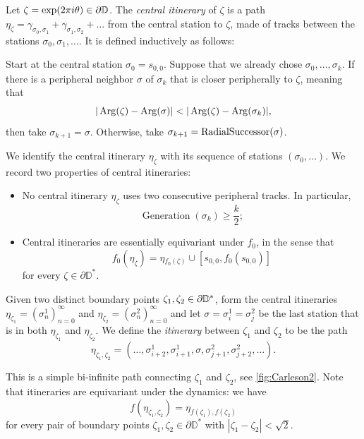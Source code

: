 \begin{definition}
Let $\zeta=\exp(2\pi i\theta)\in\partial\mathbb{D}$. 
The \emph{central itinerary} of $\zeta$ is a path 
$\eta_\zeta = \gamma _{\sigma_0,\sigma_1} + \gamma_{\sigma_1,\sigma_2}+\ldots$ 
from the central station to $\zeta$, made of tracks between the stations 
$\sigma_0,\sigma_1,\dots$. It is defined inductively as follows:

Start at the central station $\sigma_0=s_{0,0}$. Suppose that we already chose $\sigma_0,\ldots,\sigma_k$. If there is a peripheral neighbor $\sigma$ of $\sigma_k$ that is closer peripherally to $\zeta$, meaning that
$$
|\operatorname{Arg}(\zeta)-\operatorname{Arg}(\sigma)|
< |\operatorname{Arg}(\zeta)-\operatorname{Arg}(\sigma_{k})|,
$$
then take $\sigma_{k+1}=\sigma$. Otherwise, take $\sigma_{k+1}=\operatorname{RadialSuccessor}(\sigma)$.
\end{definition}



We identify the central itinerary $\eta_{\zeta}$ with its sequence of stations $(\sigma_0,\ldots)$. We record two properties of central itineraries:

\begin{itemize}
	\item No central itinerary $\eta_{\zeta}$ uses two consecutive peripheral tracks. In particular,
	\begin{equation}
	\label{generation-lower-bound}
		\operatorname{Generation}(\sigma_k)\geq \frac k2;
	\end{equation}
	
	\item Central itineraries are essentially equivariant under $f_{0}$, in the sense that
	\begin{equation*}
		f_{0}(\eta_{\zeta})=\eta{}_{f_{0}(\zeta)}\cup[s_{0,0},f_0(s_{0,0})]
	\end{equation*}
	for every $\zeta\in \partial \mathbb D^*$.
\end{itemize}

\begin{definition}
\label{def-disk-itinerary}
Given two distinct boundary points $\zeta_{1},\zeta_{2}\in\partial\mathbb{D}^*$, form the central itineraries $\eta_{\zeta_{1}}= (\sigma_{n}^{1} )_{n=0}^{\infty}$ and $\eta_{\zeta_{2}}= (\sigma_{n}^{2} )_{n=0}^{\infty}$ and let  $\sigma=\sigma^1_i=\sigma^2_j$ be the last station that is in both $\eta_{\zeta_{1}}$ and $\eta_{\zeta_{2}}$.  
	 We define the \emph{itinerary} between  $\zeta_{1}$ and $\zeta_{2}$ to be the path 
$$
 \eta_{\zeta_{1},\zeta_{2}}=   (\dots,\sigma_{i+2}^{1},\sigma_{i+1}^{1},\sigma,\sigma_{j+1}^{2},\sigma_{j+2}^{2},\dots ).
$$

	This is a simple bi-infinite path connecting $\zeta_{1}$ and $\zeta_{2}$, see \cref{fig:Carleson2}. Note that itineraries are equivariant under the dynamics: we have  \begin{equation}
		f(\eta_{\zeta_1,\zeta_2})=\eta_{f(\zeta_1),f(\zeta_2)}
	\end{equation} for every pair of boundary points $\zeta_1,\zeta_2 \in \partial \mathbb D^*$ with $|\zeta_1-\zeta_2| < \sqrt{2}$.
\end{definition}


